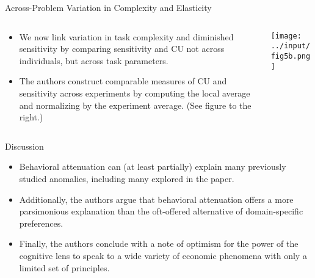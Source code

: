\documentclass[11pt, aspectratio=169]{beamer}
\begin{document}

\begin{frame}{Across-Problem Variation in Complexity and Elasticity}
    

    \begin{columns}
    
        \begin{column}{0.4\textwidth}
            \begin{itemize}
                \item We now link variation 
                    in task complexity 
                    and diminished sensitivity
                    by comparing
                    sensitivity and CU not 
                    across individuals, but 
                    across task parameters.
                \item The authors construct comparable 
                    measures of CU and sensitivity
                    across experiments by computing 
                    the local average and normalizing 
                    by the experiment average. (See 
                    figure to the right.)
            \end{itemize}
        \end{column}
    
        \begin{column}{0.7\textwidth}
            \texttt{[image: ../input/fig5b.png]}
        \end{column}
    
    \end{columns}

\end{frame}


    
    
\begin{frame}{Discussion}
    
    \begin{itemize}
        \item Behavioral attenuation can (at least partially)
            explain many previously studied
            anomalies, including many explored in the paper.
        \item Additionally, the authors argue that 
            behavioral attenuation offers
            a more parsimonious explanation
            than the oft-offered alternative of 
            domain-specific preferences.
        \item Finally, the authors conclude 
            with a note of optimism for the 
            power of the cognitive lens to 
            speak to a wide variety of 
            economic phenomena with 
            only a limited set of principles.
    \end{itemize}
    
\end{frame}
\end{document}
